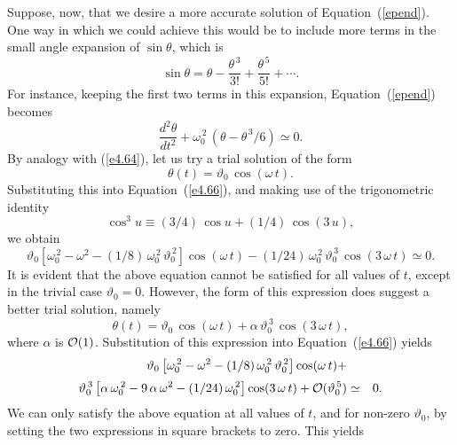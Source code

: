 Suppose, now, that we desire a more accurate solution of Equation~(\ref{epend}).
One way in which we could achieve this would be to include
more terms in the small angle expansion of $\sin\theta$, which is
\begin{equation}
\sin\theta = \theta - \frac{\theta^{\,3}}{3!} + \frac{\theta^{\,5}}{5!} +\cdots.
\end{equation}
For instance, keeping the first two terms in this expansion, Equation~(\ref{epend})
becomes
\begin{equation}\label{e4.66}
\frac{d^2\theta}{dt^2} + \omega_0^{\,2}\,(\theta-\theta^{\,3}/6)\simeq 0.
\end{equation}
By analogy with (\ref{e4.64}), let us try a trial solution of the
form
\begin{equation}
\theta(t) = \vartheta_0\,\cos(\omega\,t).
\end{equation}
Substituting this into Equation~(\ref{e4.66}), 
and making use of the trigonometric identity
\begin{equation}
\cos^3 u \equiv (3/4)\,\cos u+ (1/4)\,\cos(3\,u),
\end{equation}
we obtain
\begin{equation}
\vartheta_0\left[\omega_0^{\,2}-\omega^2 - (1/8)\,\omega_0^{\,2}\,\vartheta_0^{\,2} \right] \cos(\omega\,t)- (1/24)\,\omega_0^{\,2}\,\vartheta_0^{\,3} \,\cos(3\,\omega\,t)\simeq 0.
\end{equation}
It is evident that the above equation cannot be satisfied for all values of $t$,
except in the trivial case $\vartheta_0=0$. However, the
form of this expression does suggest a better trial solution, namely
\begin{equation}\label{e4.70}
\theta(t) = \vartheta_0\,\cos(\omega\,t) + \alpha\,\vartheta_0^{\,3}\,\cos(3\,\omega\,t),
\end{equation}
where $\alpha$ is ${\cal O}(1)$. Substitution of this expression into 
Equation~(\ref{e4.66}) yields
\begin{eqnarray}
\vartheta_0\left[\omega_0^{\,2}-\omega^2 - (1/8)\,\omega_0^{\,2}\,\vartheta_0^{\,2} \right] \cos(\omega\,t) + &&\nonumber\\[0.5ex]\vartheta_0^{\,3}\left[\alpha\,\omega_0^{\,2} - 9\,\alpha\,\omega^2-
(1/24)\,\omega_0^{\,2}\right] \cos(3\,\omega\,t) + {\cal O}(\vartheta_0^{\,5})&\simeq& 0.
\end{eqnarray}
We can only satisfy the above equation at all values of $t$, and for non-zero $\vartheta_0$, by setting the two expressions in square brackets to zero.
This yields
